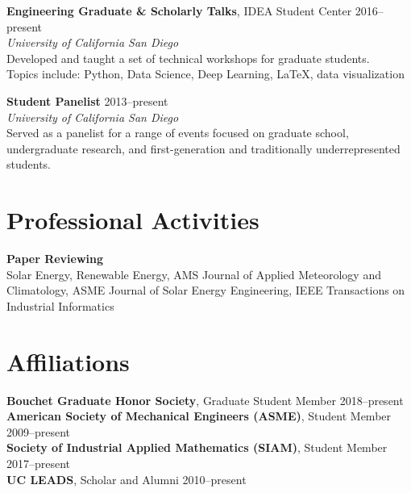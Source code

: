 \documentclass[10pt]{res}
\begin{document}
\begin{resume}
\textbf{Engineering Graduate \& Scholarly Talks}, IDEA Student Center \hfill 2016--present \\
\textit{University of California San Diego} \\
Developed and taught a set of technical workshops for graduate students. \\
Topics include: Python, Data Science, Deep Learning, LaTeX, data visualization

\textbf{Student Panelist} \hfill 2013--present \\
\textit{University of California San Diego} \\
Served as a panelist for a range of events focused on graduate school,
undergraduate research, and first-generation and traditionally underrepresented
students.


\section{Professional Activities}
\vspace{0.1in}

\textbf{Paper Reviewing} \\
Solar Energy, Renewable Energy, AMS Journal of Applied Meteorology and
Climatology, ASME Journal of Solar Energy Engineering, IEEE Transactions on
Industrial Informatics


\section{Affiliations}
\vspace{0.1in}

\textbf{Bouchet Graduate Honor Society}, Graduate Student Member \hfill 2018--present \\
\textbf{American Society of Mechanical Engineers (ASME)}, Student Member \hfill 2009--present \\
\textbf{Society of Industrial Applied Mathematics (SIAM)}, Student Member \hfill 2017--present \\
\textbf{UC LEADS}, Scholar and Alumni \hfill 2010--present



\end{resume}
\end{document}
